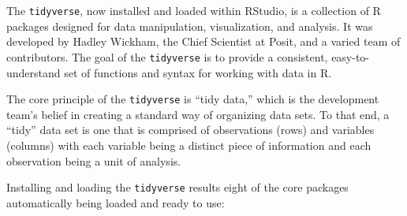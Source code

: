 \documentclass[
  letterpaper,
]{krantz}
\begin{document}
The \texttt{tidyverse}, now installed and loaded within RStudio, is a
collection of R packages designed for data manipulation, visualization,
and analysis. It was developed by Hadley Wickham, the Chief Scientist at
Posit, and a varied team of contributors. The goal of the
\texttt{tidyverse} is to provide a consistent, easy-to-understand set of
functions and syntax for working with data in R.

The core principle of the \texttt{tidyverse} is ``tidy data,'' which is
the development team's belief in creating a standard way of organizing
data sets. To that end, a ``tidy'' data set is one that is comprised of
observations (rows) and variables (columns) with each variable being a
distinct piece of information and each observation being a unit of
analysis.

Installing and loading the \texttt{tidyverse} results eight of the core
packages automatically being loaded and ready to use:
\end{document}
